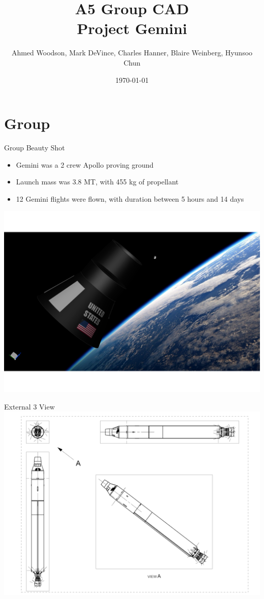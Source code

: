 \documentclass[10pt]{beamer}
\title{A5 Group CAD \\Project Gemini}
\author{Ahmed Woodson, Mark DeVince, Charles Hanner, Blaire Weinberg, Hyunsoo Chun}
\date{\today}
\begin{document}
	\frame{\titlepage}
	
\section{Group}
	
	\begin{frame}{Group Beauty Shot}
		\begin{minipage}{0.49\textwidth}
			\begin{itemize}
				\item Gemini was a 2 crew Apollo proving ground
				\item Launch mass was 3.8 MT, with 455 kg of propellant
				\item 12 Gemini flights were flown, with duration between 5 hours and 14 days
			\end{itemize}
		\end{minipage}%
		\begin{minipage}{0.49\textwidth}
			\includegraphics[width=\textwidth]{Group_Beauty.png}
		\end{minipage}
	\end{frame}

	\begin{frame}{External 3 View}
		\includegraphics[width=\textwidth]{External_3_View.png}
	\end{frame}
\end{document}
